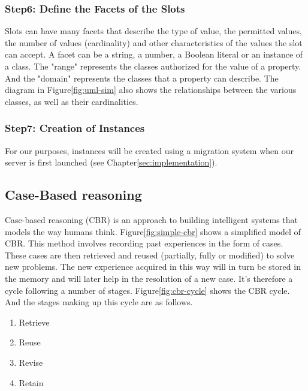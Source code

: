    
    \subsubsection{Step6: Define the Facets of the Slots}
    Slots can have many facets that describe the type of value, the permitted values, the number of values (cardinality) and other characteristics of the values the slot can accept. A facet can be a string, a number, a Boolean literal or an instance of a class. The "range" represents the classes authorized for the value of a property. And the "domain" represents the classes that a property can describe. The diagram in Figure\ref{fig:uml-sim} also shows the relationships between the various classes, as well as their cardinalities.
    
    
    \subsubsection{Step7: Creation of Instances}
    For our purposes, instances will be created using a migration system when our server is first launched (see Chapter\ref{sec:implementation}).
    

\subsection{Case-Based reasoning}
Case-based reasoning (CBR) is an approach to building intelligent systems that models the way humans think. Figure\ref{fig:simple-cbr} shows a simplified model of CBR. This method involves recording past experiences in the form of cases. These cases are then retrieved and reused (partially, fully or modified) to solve new problems. The new experience acquired in this way will in turn be stored in the memory and will later help in the resolution of a new case. It's therefore a cycle following a number of stages. Figure\ref{fig:cbr-cycle} shows the CBR cycle. And the stages making up this cycle are as follows.
    
    \begin{enumerate}
        \item Retrieve
        \item Reuse
        \item Revise
        \item Retain
    \end{enumerate}
    
